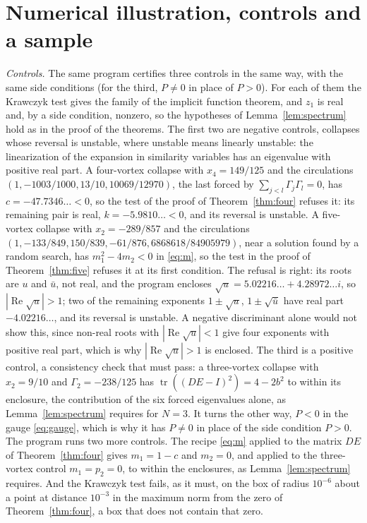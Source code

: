 \documentclass[11pt]{article}
\theoremstyle{definition}
\newcommand{\re}{\operatorname{Re}}
\newcommand{\tr}{\operatorname{tr}}
\begin{document}
\section{Numerical illustration, controls and a sample}\label{sec:numerics}

\emph{Controls.} The same program certifies three controls in the same way, with the same side conditions (for the third, $P \ne 0$ in place of $P > 0$). For each of them the Krawczyk test gives the family of the implicit function theorem, and $z_1$ is real and, by a side condition, nonzero, so the hypotheses of Lemma~\ref{lem:spectrum} hold as in the proof of the theorems. The first two are negative controls, collapses whose reversal is unstable, where unstable means linearly unstable: the linearization of the expansion in similarity variables has an eigenvalue with positive real part. A four-vortex collapse with $x_4 = 149/125$ and the circulations $(1, -1003/1000, 13/10, 10069/12970)$, the last forced by $\sum_{j<l}\Gamma_j\Gamma_l = 0$, has $c = -47.7346\ldots < 0$, so the test of the proof of Theorem~\ref{thm:four} refuses it: its remaining pair is real, $k = -5.9810\ldots < 0$, and its reversal is unstable. A five-vortex collapse with $x_2 = -289/857$ and the circulations $(1, -133/849, 150/839, -61/876, 6868618/84905979)$, near a solution found by a random search, has $m_1^2 - 4m_2 < 0$ in \eqref{eq:m}, so the test in the proof of Theorem~\ref{thm:five} refuses it at its first condition. The refusal is right: its roots are $u$ and $\bar u$, not real, and the program encloses $\sqrt u = 5.02216\ldots + 4.28972\ldots i$, so $|\re\sqrt u| > 1$; two of the remaining exponents $1 \pm \sqrt u$, $1 \pm \sqrt{\bar u}$ have real part $-4.02216\ldots$, and its reversal is unstable. A negative discriminant alone would not show this, since non-real roots with $|\re\sqrt u| < 1$ give four exponents with positive real part, which is why $|\re\sqrt u| > 1$ is enclosed. The third is a positive control, a consistency check that must pass: a three-vortex collapse with $x_2 = 9/10$ and $\Gamma_2 = -238/125$ has $\tr((DE - I)^2) = 4 - 2b^2$ to within its enclosure, the contribution of the six forced eigenvalues alone, as Lemma~\ref{lem:spectrum} requires for $N = 3$. It turns the other way, $P < 0$ in the gauge \eqref{eq:gauge}, which is why it has $P \ne 0$ in place of the side condition $P > 0$. The program runs two more controls. The recipe \eqref{eq:m} applied to the matrix $DE$ of Theorem~\ref{thm:four} gives $m_1 = 1 - c$ and $m_2 = 0$, and applied to the three-vortex control $m_1 = p_2 = 0$, to within the enclosures, as Lemma~\ref{lem:spectrum} requires. And the Krawczyk test fails, as it must, on the box of radius $10^{-6}$ about a point at distance $10^{-3}$ in the maximum norm from the zero of Theorem~\ref{thm:four}, a box that does not contain that zero.
\end{document}
